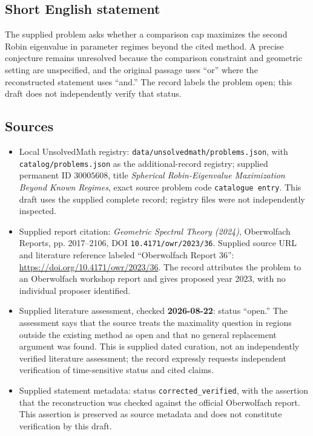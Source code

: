 \documentclass[11pt]{article}
\begin{document}
\subsection{Short English statement}
The supplied problem asks whether a comparison cap maximizes the second Robin eigenvalue in parameter regimes beyond the cited method. A precise conjecture remains unresolved because the comparison constraint and geometric setting are unspecified, and the original passage uses ``or'' where the reconstructed statement uses ``and.'' The record labels the problem open; this draft does not independently verify that status.
\subsection{Sources}
\begin{itemize}
\item Local UnsolvedMath registry: \texttt{data/unsolvedmath/problems.json}, with \texttt{catalog/problems.json} as the additional-record registry; supplied permanent ID \(30005608\), title \emph{Spherical Robin-Eigenvalue Maximization Beyond Known Regimes}, exact source problem code \texttt{catalogue entry}. This draft uses the supplied complete record; registry files were not independently inspected.
\item Supplied report citation: \emph{Geometric Spectral Theory (2024)}, Oberwolfach Reports, pp. 2017--2106, DOI \texttt{10.4171/owr/2023/36}. Supplied source URL and literature reference labeled ``Oberwolfach Report 36'': \url{https://doi.org/10.4171/owr/2023/36}. The record attributes the problem to an Oberwolfach workshop report and gives proposed year 2023, with no individual proposer identified.
\item Supplied literature assessment, checked \textbf{2026-08-22}: status ``open.'' The assessment says that the source treats the maximality question in regions outside the existing method as open and that no general replacement argument was found. This is supplied dated curation, not an independently verified literature assessment; the record expressly requests independent verification of time-sensitive status and cited claims.
\item Supplied statement metadata: status \texttt{corrected\_verified}, with the assertion that the reconstruction was checked against the official Oberwolfach report. This assertion is preserved as source metadata and does not constitute verification by this draft.
\end{itemize}
\end{document}
